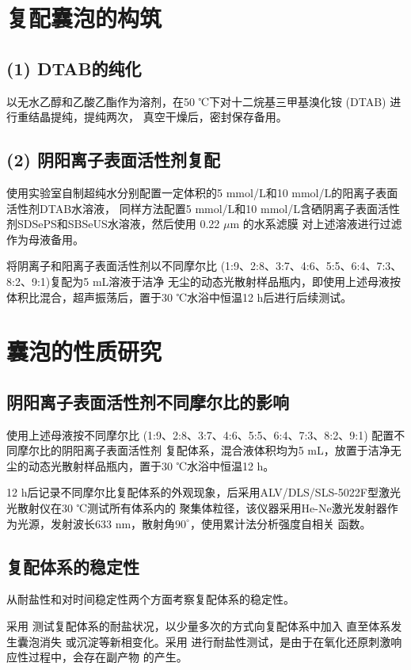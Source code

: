 \documentclass[bachelor,winfonts,replaceperiod]{jnuthesis}
\begin{document}
    \section{复配囊泡的构筑}
    \subsection*{(1) DTAB的纯化}
    以无水乙醇和乙酸乙酯作为溶剂，在50 ℃下对十二烷基三甲基溴化铵 (DTAB) 进行重结晶提纯，提纯两次，
    真空干燥后，密封保存备用。
    
    \subsection*{(2) 阴阳离子表面活性剂复配}
    使用实验室自制超纯水分别配置一定体积的5 mmol/L和10 mmol/L的阳离子表面活性剂DTAB水溶液，
    同样方法配置5 mmol/L和10 mmol/L含硒阴离子表面活性剂SDSePS和SBSeUS水溶液，然后使用 0.22 $\mu$m 的水系滤膜
    对上述溶液进行过滤作为母液备用。
    
    将阴离子和阳离子表面活性剂以不同摩尔比 (1:9、2:8、3:7、4:6、5:5、6:4、7:3、8:2、9:1)复配为5 mL溶液于洁净
    无尘的动态光散射样品瓶内，即使用上述母液按体积比混合，超声振荡后，置于30 ℃水浴中恒温12 h后进行后续测试。
        
    \section{囊泡的性质研究}
    \subsection{阴阳离子表面活性剂不同摩尔比的影响}
    使用上述母液按不同摩尔比 (1:9、2:8、3:7、4:6、5:5、6:4、7:3、8:2、9:1) 配置不同摩尔比的阴阳离子表面活性剂
    复配体系，混合液体积均为5 mL，放置于洁净无尘的动态光散射样品瓶内，置于30 ℃水浴中恒温12 h。
    
    12 h后记录不同摩尔比复配体系的外观现象，后采用ALV/DLS/SLS-5022F型激光光散射仪在30 ℃测试所有体系内的
    聚集体粒径，该仪器采用He-Ne激光发射器作为光源，发射波长633 nm，散射角$90^\circ$，使用累计法分析强度自相关
    函数。
    
    \subsection{复配体系的稳定性}
    从耐盐性和对时间稳定性两个方面考察复配体系的稳定性。
    
    采用 测试复配体系的耐盐状况，以少量多次的方式向复配体系中加入 直至体系发生囊泡消失
    或沉淀等新相变化。采用 进行耐盐性测试，是由于在氧化还原刺激响应性过程中，会存在副产物  
    的产生。
    
\end{document}
